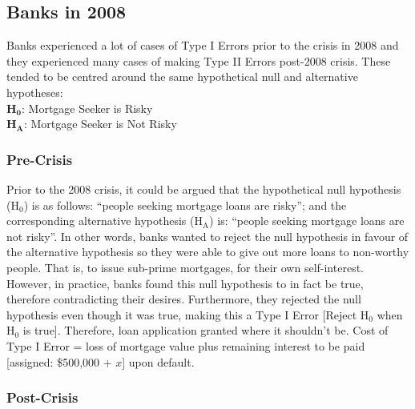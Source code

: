 \documentclass[11pt, english]{article}
\begin{document}
	\newpage

	\subsection{Banks in 2008}

	Banks experienced a lot of cases of Type I Errors prior to the crisis in 2008 and they experienced many cases of making Type II Errors post-2008 crisis. These tended to be centred around the same hypothetical null and alternative hypotheses:\\

	\textbf{H}$\mathbf{_0}$: Mortgage Seeker is Risky\\
	\textbf{H}$\mathbf{_A}$: Mortgage Seeker is Not Risky

		\subsubsection{Pre-Crisis}

	Prior to the 2008 crisis, it could be argued that the hypothetical null hypothesis (H$_0$) is as follows: ``people seeking mortgage loans are risky''; and the corresponding alternative hypothesis (H$\mathrm{_A}$) is: ``people seeking mortgage loans are not risky''. In other words, banks wanted to reject the null hypothesis in favour of the alternative hypothesis so they were able to give out more loans to non-worthy people. That is, to issue sub-prime mortgages, for their own self-interest. However, in practice, banks found this null hypothesis to in fact be true, therefore contradicting their desires. Furthermore, they rejected the null hypothesis even though it was true, making this a Type I Error [Reject H$_0$ when H$_0$ is true]. Therefore, loan application granted where it shouldn’t be. Cost of Type I Error = loss of mortgage value plus remaining interest to be paid [assigned: \$500,000 + $x$] upon default.

		\subsubsection{Post-Crisis}
\end{document}
